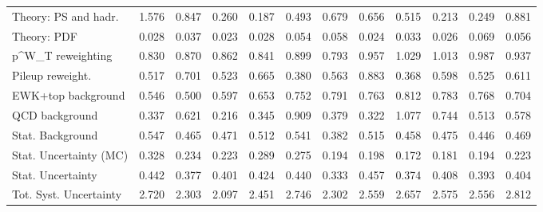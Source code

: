 \begin{tabular}{l|p{0.6cm}p{0.6cm}p{0.6cm}p{0.6cm}p{0.6cm}p{0.6cm}p{0.6cm}p{0.6cm}p{0.6cm}p{0.6cm}p{0.6cm}}
Theory: PS and hadr.                     & 1.576 & 0.847 & 0.260 & 0.187 & 0.493 & 0.679 & 0.656 & 0.515 & 0.213 & 0.249 & 0.881 \\
Theory: PDF                              & 0.028 & 0.037 & 0.023 & 0.028 & 0.054 & 0.058 & 0.024 & 0.033 & 0.026 & 0.069 & 0.056 \\
p^{W}_{T} reweighting                    & 0.830 & 0.870 & 0.862 & 0.841 & 0.899 & 0.793 & 0.957 & 1.029 & 1.013 & 0.987 & 0.937 \\
Pileup reweight.                         & 0.517 & 0.701 & 0.523 & 0.665 & 0.380 & 0.563 & 0.883 & 0.368 & 0.598 & 0.525 & 0.611 \\
EWK+top background                       & 0.546 & 0.500 & 0.597 & 0.653 & 0.752 & 0.791 & 0.763 & 0.812 & 0.783 & 0.768 & 0.704 \\
QCD background                           & 0.337 & 0.621 & 0.216 & 0.345 & 0.909 & 0.379 & 0.322 & 1.077 & 0.744 & 0.513 & 0.578 \\
Stat. Background                         & 0.547 & 0.465 & 0.471 & 0.512 & 0.541 & 0.382 & 0.515 & 0.458 & 0.475 & 0.446 & 0.469 \\
Stat. Uncertainty (MC)                   & 0.328 & 0.234 & 0.223 & 0.289 & 0.275 & 0.194 & 0.198 & 0.172 & 0.181 & 0.194 & 0.223 \\
\hline
Stat. Uncertainty                        & 0.442 & 0.377 & 0.401 & 0.424 & 0.440 & 0.333 & 0.457 & 0.374 & 0.408 & 0.393 & 0.404 \\
\hline
Tot. Syst. Uncertainty                   & 2.720 & 2.303 & 2.097 & 2.451 & 2.746 & 2.302 & 2.559 & 2.657 & 2.575 & 2.556 & 2.812 \\
\hline
\end{tabular}
